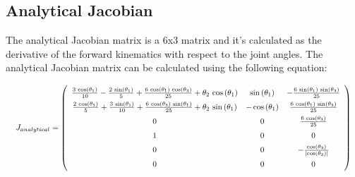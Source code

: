 \documentclass{article}
\begin{document}
\subsection{Analytical Jacobian}

The analytical Jacobian matrix is a 6x3 matrix and it's calculated as the derivative of the forward kinematics with respect to the joint angles.
The analytical Jacobian matrix can be calculated using the following equation:

\begin{equation}
    \renewcommand{\arraystretch}{1.5} %
    \resizebox{\textwidth}{!}{
        $J_{analytical} = \left(\begin{array}{ccc}
                    \frac{3\,\cos\left(\theta _{1}\right)}{10}-\frac{2\,\sin\left(\theta _{1}\right)}{5}+\frac{6\,\cos\left(\theta _{1}\right)\,\cos\left(\theta _{3}\right)}{25}+\theta _{2}\,\cos\left(\theta _{1}\right) & \sin\left(\theta _{1}\right)  & -\frac{6\,\sin\left(\theta _{1}\right)\,\sin\left(\theta _{3}\right)}{25}       \\
                    \frac{2\,\cos\left(\theta _{1}\right)}{5}+\frac{3\,\sin\left(\theta _{1}\right)}{10}+\frac{6\,\cos\left(\theta _{3}\right)\,\sin\left(\theta _{1}\right)}{25}+\theta _{2}\,\sin\left(\theta _{1}\right) & -\cos\left(\theta _{1}\right) & \frac{6\,\cos\left(\theta _{1}\right)\,\sin\left(\theta _{3}\right)}{25}        \\
                    0                                                                                                                                                                                                       & 0                             & \frac{6\,\cos\left(\theta _{3}\right)}{25}                                      \\
                    1                                                                                                                                                                                                       & 0                             & 0                                                                               \\
                    0                                                                                                                                                                                                       & 0                             & -\frac{\cos\left(\theta _{3}\right)}{\left|\cos\left(\theta _{3}\right)\right|} \\
                    0                                                                                                                                                                                                       & 0                             & 0
                \end{array}\right)$
    }
\end{equation}
\end{document}
